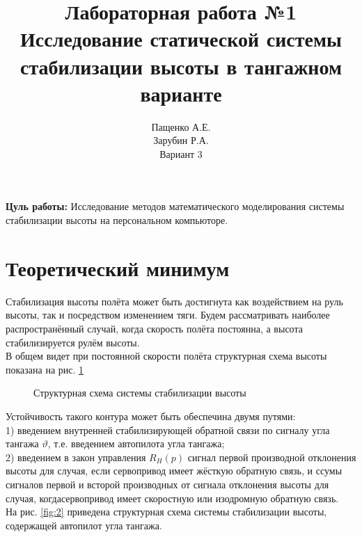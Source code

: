 \documentclass[a4paper,12pt]{article}
\title{\textbf{Лабораторная работа №1}\\ Исследование статической системы стабилизации высоты в тангажном варианте}
\author{Пащенко А.Е.\\Зарубин Р.А.\\Вариант 3}
\date{}
\begin{document}
 

\maketitle %
\textbf{Цуль работы:} Исследование методов математического моделирования системы стабилизации высоты на персональном компьюторе.
\section{Теоретический минимум}
Стабилизация высоты полёта может быть достигнута как воздействием на руль высоты, так и посредством изменением тяги. Будем рассматривать наиболее распространённый случай, 
когда скорость полёта постоянна, а высота стабилизируется рулём высоты.\\
В общем видет при постоянной скорости полёта структурная схема высоты показана 
на рис. \ref{fig:1}

\begin{figure}[H]
    \caption{Структурная схема системы стабилизации высоты}
    \label{fig:1}
\end{figure}
 
Устойчивость такого контура может быть обеспечина двумя путями: \\ 

1) введением внутренней стабилизирующей обратной связи по сигналу угла тангажа 
$\vartheta$, т.е. введением автопилота угла тангажа;\\

2) введением в закон управления $R_{H}(p)$ сигнал первой производной отклонения высоты для случая, если сервопривод имеет жёсткую обратную связь,
и ссумы сигналов первой и всторой производных от сигнала отклонения высоты для случая, 
когдасервопривод имеет скоростную или изодромную обратную связь.\\

На рис. \ref{fig:2} приведена структурная схема системы стабилизации высоты, содержащей автопилот угла тангажа.
\end{document}
